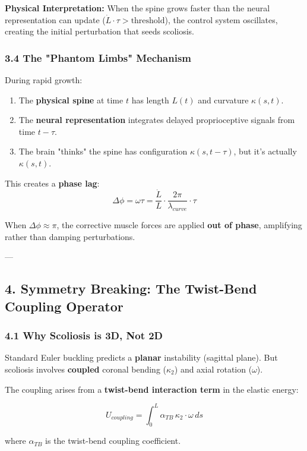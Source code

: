 \documentclass[11pt,a4paper]{article}
\begin{document}
\textbf{Physical Interpretation:}
When the spine grows faster than the neural representation can update ($\dot{L} \cdot \tau > \text{threshold}$), the control system oscillates, creating the initial perturbation that seeds scoliosis.

\subsubsection{3.4 The "Phantom Limbs" Mechanism}

During rapid growth:

\begin{enumerate}
\item The \textbf{physical spine} at time $t$ has length $L(t)$ and curvature $\kappa(s,t)$.
\item The \textbf{neural representation} integrates delayed proprioceptive signals from time $t-\tau$.
\item The brain "thinks" the spine has configuration $\kappa(s, t-\tau)$, but it's actually $\kappa(s,t)$.
\end{enumerate}

This creates a \textbf{phase lag}:
$$
\Delta \phi = \omega \tau = \frac{\dot{L}}{L} \cdot \frac{2\pi}{\lambda_{curve}} \cdot \tau
$$

When $\Delta \phi \approx \pi$, the corrective muscle forces are applied \textbf{out of phase}, amplifying rather than damping perturbations.

---

\subsection{4. Symmetry Breaking: The Twist-Bend Coupling Operator}

\subsubsection{4.1 Why Scoliosis is 3D, Not 2D}

Standard Euler buckling predicts a \textbf{planar} instability (sagittal plane). But scoliosis involves \textbf{coupled} coronal bending ($\kappa_2$) and axial rotation ($\omega$).

The coupling arises from a \textbf{twist-bend interaction term} in the elastic energy:

$$
U_{coupling} = \int_0^L \alpha_{TB} \, \kappa_2 \cdot \omega \, ds
$$

where $\alpha_{TB}$ is the twist-bend coupling coefficient.
\end{document}
